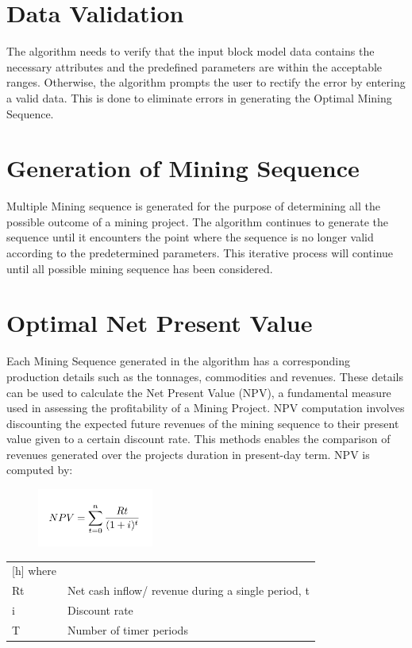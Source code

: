 \documentclass[12pt]{report}
\begin{document}
\section{Data Validation}

The algorithm needs to verify that the input block model data contains the necessary attributes and the predefined parameters are within the acceptable ranges. 
Otherwise, the algorithm prompts the user to rectify the error by entering a valid data.
This is done to eliminate errors in generating the Optimal Mining Sequence.

\section{Generation of Mining Sequence}

Multiple Mining sequence is generated for the purpose of determining all the possible outcome of a mining project. 
The algorithm continues to generate the sequence until it encounters the point where the sequence is no longer valid according to the predetermined parameters. 
This iterative process will continue until all possible mining sequence has been considered.

\section{Optimal Net Present Value}

Each Mining Sequence generated in the algorithm has a corresponding production details such as the tonnages, commodities and revenues. 
These details can be used to calculate the Net Present Value (NPV), a fundamental measure used in assessing the profitability of a Mining Project. 
NPV computation involves discounting the expected future revenues of the mining sequence to their present value given to a certain discount rate. 
This methods enables the comparison of revenues generated over the projects duration in present-day term. 
NPV is computed by: 

\begin{figure}[h]
    \includegraphics[width=1.5in]{img/NPV}
\end{figure}

\begin{tabular}{@{}l@{ : }l}[h]
 where\\
  Rt & Net cash inflow/ revenue during a single period, t \\
  i & Discount rate\\
  T & Number of timer periods \\
  \end{tabular}
  
\end{document}
